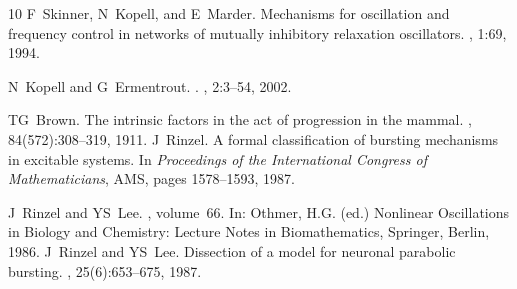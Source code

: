 \documentclass[nofootinbib,aip,amsmath,amssymb,preprint,twocolumn,floatfix,10pt]{revtex4-2}
\begin{document}
\begin{thebibliography}{10}
F~Skinner, N~Kopell, and E~Marder.
\newblock Mechanisms for oscillation and frequency control in networks of
  mutually inhibitory relaxation oscillators.
, 1:69, 1994.

N~Kopell and G~Ermentrout.
.
, 2:3--54, 2002.

TG~Brown.
\newblock The intrinsic factors in the act of progression in the mammal.
, 84(572):308--319, 1911.
J~Rinzel.
\newblock A formal classification of bursting mechanisms in excitable systems.
\newblock In {\em Proceedings of the International Congress of Mathematicians}, AMS, pages 1578--1593, 1987.

J~Rinzel and YS~Lee.
,
  volume~66.
\newblock In: Othmer, H.G. (ed.) Nonlinear Oscillations in Biology and
  Chemistry: Lecture Notes in Biomathematics, Springer, Berlin, 1986.
J~Rinzel and YS~Lee.
\newblock Dissection of a model for neuronal parabolic bursting.
, 25(6):653--675, 1987.

\end{thebibliography}
\end{document}
